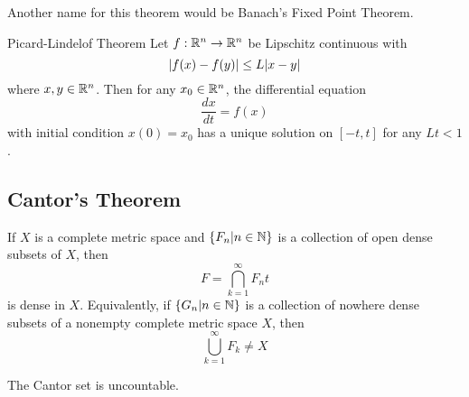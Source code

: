 \documentclass[a4paper]{article}
\begin{document}
Another name for this theorem would be Banach's Fixed Point Theorem. 

\begin{thm}{Picard-Lindelof Theorem}{} Let $f:\mathbb{R}^n\to\mathbb{R}^n$ be Lipschitz continuous with $$\abs{f(x)-f(y)}\leq L\abs{x-y}$$ where $x,y\in\mathbb{R}^n$. Then for any $x_0\in\mathbb{R}^n$, the differential equation $$\frac{dx}{dt}=f(x)$$ with initial condition $x(0)=x_0$ has a unique solution on $[-t,t]$ for any $Lt<1$. 
\end{thm}

\subsection{Cantor's Theorem}
\begin{thm}{}{} If $X$ is a complete metric space and $\{F_n|n\in\mathbb{N}\}$ is a collection of open dense subsets of $X$, then $$F=\bigcap_{k=1}^\infty F_nt$$ is dense in $X$. Equivalently, if $\{G_n|n\in\mathbb{N}\}$ is a collection of nowhere dense subsets of a nonempty complete metric space $X$, then $$\bigcup_{k=1}^\infty F_k\neq X$$
\end{thm}

\begin{lmm}{}{} The Cantor set is uncountable. 
\end{lmm}
\end{document}
